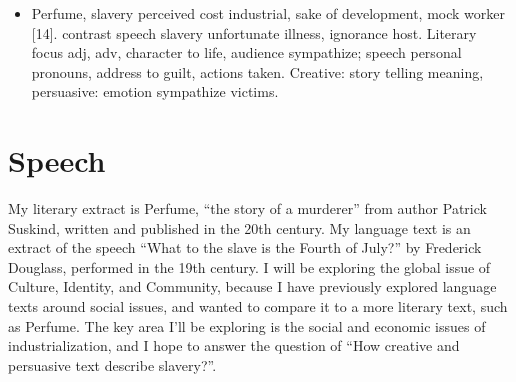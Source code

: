 \documentclass[a4paper,12pt]{article}
\begin{document}
\begin{itemize}
 \item Perfume, slavery perceived cost industrial, sake of development, mock worker [14]. contrast speech slavery unfortunate illness, ignorance host. Literary focus adj, adv, character to life, audience sympathize; speech personal pronouns, address to guilt, actions taken. Creative: story telling meaning, persuasive: emotion sympathize victims.
\end{itemize}

\newpage
\section{Speech}
My literary extract is Perfume, ``the story of a murderer'' from author Patrick Suskind, written and published in the 20th century. My language text is an extract of the speech ``What to the slave is the Fourth of July?'' by Frederick Douglass, performed in the 19th century. I will be exploring the global issue of Culture, Identity, and Community, because I have previously explored language texts around social issues, and wanted to compare it to a more literary text, such as Perfume. The key area I'll be exploring is the social and economic issues of industrialization, and I hope to answer the question of ``How creative and persuasive text describe slavery?''.
\end{document}

